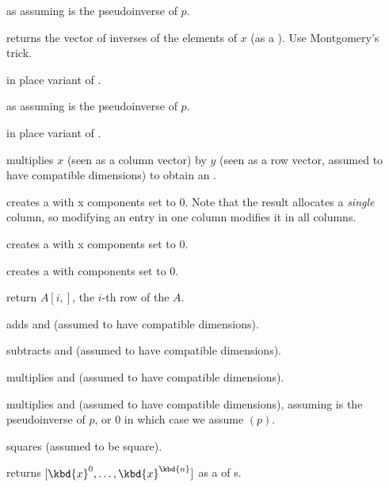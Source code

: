  as 
assuming  is the pseudoinverse of $p$.

 returns the vector of inverses of the
elements of $x$ (as a ). Use Montgomery's trick.

 in place variant of .

 as 
assuming  is the pseudoinverse of $p$.

 in place variant of
.

 multiplies $x$
(seen as a column vector) by $y$ (seen as a row vector,
assumed to have compatible dimensions) to obtain an .

 creates a  with  x 
components set to $0$. Note that the result allocates a
\emph{single} column, so modifying an entry in one column modifies it in
all columns.

 creates a  with  x
 components set to $0$.

 creates a  with  components set to
$0$.

 return $A[i,]$, the $i$-th row of the
 $A$.

 adds  and 
(assumed to have compatible dimensions).

 subtracts  and 
(assumed to have compatible dimensions).

 multiplies   and 
(assumed to have compatible dimensions).

 multiplies   and
 (assumed to have compatible dimensions), assuming  is the
pseudoinverse of $p$, or $0$ in which case we assume $(p)$.

 squares 
(assumed to be square).

 returns
$[\kbd{x}^0, \dots, \kbd{x}^\kbd{n}]$ as a  of s.

